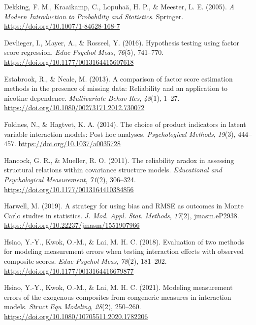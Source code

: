 \documentclass[
  man]{apa6}
\newlength{\cslhangindent}
\newlength{\cslentryspacingunit} %
\newenvironment{CSLReferences}[2] %
 {%
  \setlength{\parindent}{0pt}
  \ifodd #1
  \let\oldpar\par
  \def\par{\hangindent=\cslhangindent\oldpar}
  \fi
  \setlength{\parskip}{#2\cslentryspacingunit}
 }%
 {}
\begin{document}
\begin{CSLReferences}{1}{0}
\leavevmode{}%
Dekking, F. M., Kraaikamp, C., Lopuhaä, H. P., \& Meester, L. E. (2005). \emph{A {Modern Introduction} to {Probability} and {Statistics}}. Springer. \url{https://doi.org/10.1007/1-84628-168-7}

\leavevmode{}%
Devlieger, I., Mayer, A., \& Rosseel, Y. (2016). Hypothesis testing using factor score regression. \emph{Educ Psychol Meas}, \emph{76}(5), 741--770. \url{https://doi.org/10.1177/0013164415607618}

\leavevmode{}%
Estabrook, R., \& Neale, M. (2013). A comparison of factor score estimation methods in the presence of missing data: {Reliability} and an application to nicotine dependence. \emph{Multivariate Behav Res}, \emph{48}(1), 1--27. \url{https://doi.org/10.1080/00273171.2012.730072}

\leavevmode{}%
Foldnes, N., \& Hagtvet, K. A. (2014). The choice of product indicators in latent variable interaction models: {Post} hoc analyses. \emph{Psychological Methods}, \emph{19}(3), 444--457. \url{https://doi.org/10.1037/a0035728}

\leavevmode{}%
Hancock, G. R., \& Mueller, R. O. (2011). The reliability aradox in assessing structural relations within covariance structure models. \emph{Educational and Psychological Measurement}, \emph{71}(2), 306--324. \url{https://doi.org/10.1177/0013164410384856}

\leavevmode{}%
Harwell, M. (2019). A strategy for using bias and {RMSE} as outcomes in {Monte Carlo} studies in statistics. \emph{J. Mod. Appl. Stat. Methods}, \emph{17}(2), jmasm.eP2938. \url{https://doi.org/10.22237/jmasm/1551907966}

\leavevmode{}%
Hsiao, Y.-Y., Kwok, O.-M., \& Lai, M. H. C. (2018). Evaluation of two methods for modeling measurement errors when testing interaction effects with observed composite scores. \emph{Educ Psychol Meas}, \emph{78}(2), 181--202. \url{https://doi.org/10.1177/0013164416679877}

\leavevmode{}%
Hsiao, Y.-Y., Kwok, O.-M., \& Lai, M. H. C. (2021). Modeling measurement errors of the exogenous composites from congeneric measures in interaction models. \emph{Struct Equ Modeling}, \emph{28}(2), 250--260. \url{https://doi.org/10.1080/10705511.2020.1782206}


\end{CSLReferences}
\end{document}

